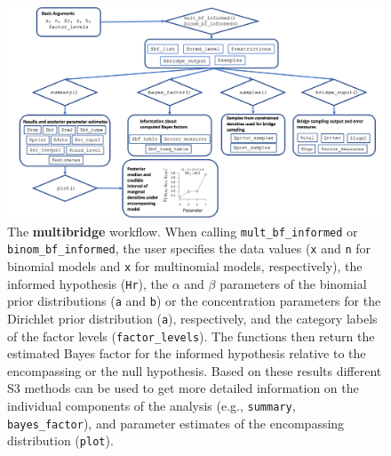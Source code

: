 \documentclass[
  english,
  man,floatsintext]{apa6}
\begin{document}
\begin{figure}
\includegraphics[width=500px]{scheme_multibridge} \caption{The \textbf{multibridge} workflow. When calling \texttt{mult\_bf\_informed} or \texttt{binom\_bf\_informed}, the user specifies the data values (\texttt{x} and \texttt{n} for binomial models and \texttt{x} for multinomial models, respectively), the informed hypothesis (\texttt{Hr}), the \(\alpha\) and \(\beta\) parameters of the binomial prior distributions (\texttt{a} and \texttt{b}) or the concentration parameters for the Dirichlet prior distribution (\texttt{a}), respectively, and the category labels of the factor levels (\texttt{factor\_levels}). The functions then return the estimated Bayes factor for the informed hypothesis relative to the encompassing or the null hypothesis. Based on these results different S3 methods can be used to get more detailed information on the individual components of the analysis (e.g., \texttt{summary}, \texttt{bayes\_factor}), and parameter estimates of the encompassing distribution (\texttt{plot}).}\label{fig:scheme-multibridge}
\end{figure}
\clearpage
\end{document}
